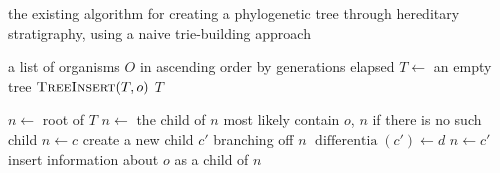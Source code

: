 \begin{algorithm}[h]
    \caption{the existing algorithm for creating a phylogenetic tree through hereditary stratigraphy, using a naive trie-building approach}
    \label{alg:old}
    \begin{algorithmic}[1]
        \Require a list of organisms $O$ in ascending order by generations elapsed
            \State $T \gets$ an empty tree
                \State $\textsc{TreeInsert}(T, o)$
            \EndFor
            \State \Return $T$
        \EndFunction

            \State $n \gets$ root of $T$
                \State $n \gets$ the child of $n$ most likely contain $o$, $n$ if there is no such child
                    \State $n \gets c$
                \Else 
                    \State create a new child $c'$ branching off $n$ 
                    \State $\operatorname{differentia}(c') \gets d$
                    \State $n \gets c'$
                \EndIf
            \EndFor
            \State insert information about $o$ as a child of $n$
        \EndFunction
    \end{algorithmic}
\end{algorithm}